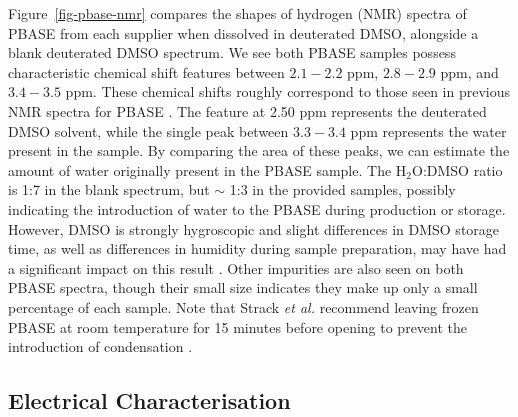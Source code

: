 \documentclass[
  a4paper,
]{scrbook}
\begin{document}
Figure~\ref{fig-pbase-nmr} compares the shapes of hydrogen (NMR) spectra
of PBASE from each supplier when dissolved in deuterated DMSO, alongside
a blank deuterated DMSO spectrum. We see both PBASE samples possess
characteristic chemical shift features between \(2.1-2.2\) ppm,
\(2.8-2.9\) ppm, and \(3.4-3.5\) ppm. These chemical shifts roughly
correspond to those seen in previous NMR spectra for PBASE
\autocite{NMR2}. The feature at 2.50 ppm represents the deuterated DMSO
solvent, while the single peak between \(3.3-3.4\) ppm represents the
water present in the sample. By comparing the area of these peaks, we
can estimate the amount of water originally present in the PBASE sample.
The H\(_{2}\)O:DMSO ratio is 1:7 in the blank spectrum, but \(\sim\) 1:3
in the provided samples, possibly indicating the introduction of water
to the PBASE during production or storage. However, DMSO is strongly
hygroscopic and slight differences in DMSO storage time, as well as
differences in humidity during sample preparation, may have had a
significant impact on this result \autocite{Lebel1962}. Other impurities
are also seen on both PBASE spectra, though their small size indicates
they make up only a small percentage of each sample. Note that Strack
\emph{et al.} recommend leaving frozen PBASE at room temperature for 15
minutes before opening to prevent the introduction of condensation
\autocite{Strack2013}.

\hypertarget{electrical-characterisation}{%
\subsection{Electrical
Characterisation}\label{electrical-characterisation}}
\end{document}

